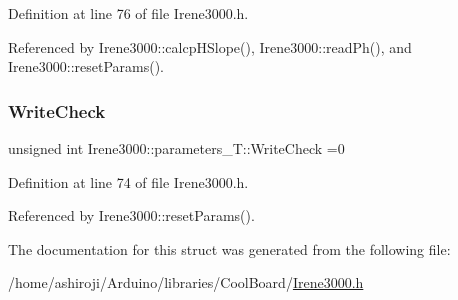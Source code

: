 Definition at line 76 of file Irene3000.\+h.



Referenced by Irene3000\+::calcp\+H\+Slope(), Irene3000\+::read\+Ph(), and Irene3000\+::reset\+Params().

\mbox{\label{structIrene3000_1_1parameters__T_a56f1f14d33a69300d580eda2dc52cecd}} 
\subsubsection{\texorpdfstring{Write\+Check}{WriteCheck}}
{\footnotesize\ttfamily unsigned int Irene3000\+::parameters\+\_\+\+T\+::\+Write\+Check =0}



Definition at line 74 of file Irene3000.\+h.



Referenced by Irene3000\+::reset\+Params().



The documentation for this struct was generated from the following file\+:\begin{DoxyCompactItemize}
\item 
/home/ashiroji/\+Arduino/libraries/\+Cool\+Board/\hyperlink{Irene3000_8h}{Irene3000.\+h}\end{DoxyCompactItemize}
